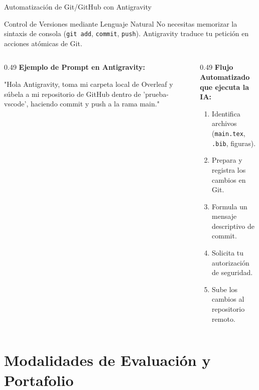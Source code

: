 \documentclass[aspectratio=169, 10pt]{beamer}
\begin{document}
\begin{frame}{Automatización de Git/GitHub con Antigravity}
  \begin{alertblock}{Control de Versiones mediante Lenguaje Natural}
    \small
    No necesitas memorizar la sintaxis de consola (\texttt{git add}, \texttt{commit}, \texttt{push}). Antigravity traduce tu petición en acciones atómicas de Git.
  \end{alertblock}

  \vspace{0.1cm}
  \begin{columns}[T]
    \begin{column}{0.49\textwidth}
      \textbf{\small Ejemplo de Prompt en Antigravity:}
      \begin{tcolorbox}[colback=pucpGray,colframe=pucpBlue,arc=1.5mm,boxrule=0.5pt,top=1.5mm,bottom=1.5mm]
        \scriptsize\ttfamily
        "Hola Antigravity, toma mi carpeta local de Overleaf y súbela a mi repositorio de GitHub dentro de 'prueba-vscode', haciendo commit y push a la rama main."
      \end{tcolorbox}
    \end{column}

    \begin{column}{0.49\textwidth}
      \textbf{\small Flujo Automatizado que ejecuta la IA:}
      \begin{enumerate}\scriptsize
        \item Identifica archivos (\texttt{main.tex}, \texttt{.bib}, figuras).
        \item Prepara y registra los cambios en Git.
        \item Formula un mensaje descriptivo de commit.
        \item Solicita tu autorización de seguridad.
        \item Sube los cambios al repositorio remoto.
      \end{enumerate}
    \end{column}
  \end{columns}
\end{frame}

\section[Evaluación]{Modalidades de Evaluación y Portafolio}
\end{document}

